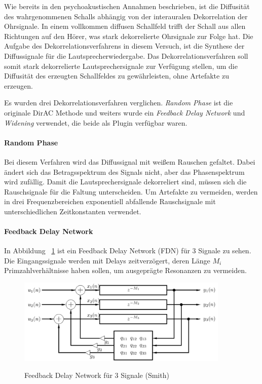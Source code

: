 Wie bereits in den psychoakustischen Annahmen beschrieben, ist die Diffusität des wahrgenommenen Schalls abhängig von der interauralen Dekorrelation der Ohrsignale. In einem vollkommen diffusen Schallfeld trifft der Schall aus allen Richtungen auf den Hörer, was stark dekorrelierte Ohrsignale zur Folge hat. Die Aufgabe des Dekorrelationsverfahrens in diesem Versuch, ist die Synthese der Diffussignale für die Lautsprecherwiedergabe. Das Dekorrelationsverfahren soll somit stark dekorrelierte Lautsprechersignale zur Verfügung stellen, um die Diffusität des erzeugten Schallfeldes zu gewährleisten, ohne Artefakte zu erzeugen.

Es wurden drei Dekorrelationsverfahren verglichen. \textit{Random Phase} ist die originale DirAC Methode und weiters wurde ein \textit{Feedback Delay Network} und \textit{Widening} verwendet, die beide als Plugin verfügbar waren.

\paragraph{Random Phase}
Bei diesem Verfahren wird das Diffussignal mit weißem Rauschen gefaltet. Dabei ändert sich das Betragsspektrum des Signals nicht, aber das Phasenspektrum wird zufällig. Damit die Lautsprechersignale dekorreliert sind, müssen sich die Rauschsignale für die Faltung unterscheiden. Um Artefakte zu vermeiden, werden in drei Frequenzbereichen exponentiell abfallende Rauschsignale mit unterschiedlichen Zeitkonstanten verwendet.

\paragraph{Feedback Delay Network}

In Abbildung ~\ref{fig:fdn} ist ein Feedback Delay Network (FDN) für 3 Signale zu sehen. Die Eingangssignale werden mit Delays zeitverzögert, deren Länge $M_i$ Primzahlverhältnisse haben sollen, um ausgeprägte Resonanzen zu vermeiden.

\begin{figure}[!ht]
  \centering
  \includegraphics[width=0.9\textwidth]{dekorrelation/pic/FDN_smith.png}
  \label{fig:flow}
  \caption{Feedback Delay Network für 3 Signale (Smith)}
  \label{fig:fdn}
\end{figure}


